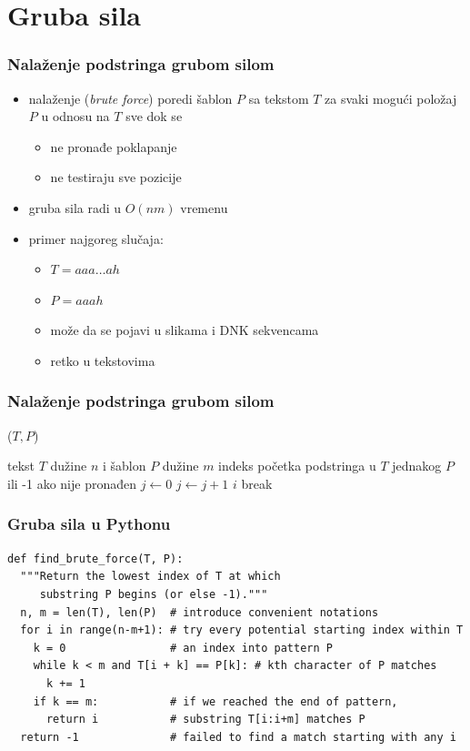 \documentclass[compress]{beamer}
\begin{document}
\section[GS]{Gruba sila}

\begin{frame}[fragile]
  \frametitle{Nalaženje podstringa grubom silom}
  \begin{itemize}
    \item nalaženje  (\textit{brute force}) poredi šablon
    $P$ sa tekstom $T$ za svaki mogući položaj $P$ u odnosu na $T$ sve dok se
    \begin{itemize}
      \item ne pronađe poklapanje
      \item ne testiraju sve pozicije
    \end{itemize}
    \item gruba sila radi u $O(nm)$ vremenu
    \item primer najgoreg slučaja:
    \begin{itemize}
      \item $T = aaa \ldots ah$
      \item $P = aaah$
      \item može da se pojavi u slikama i DNK sekvencama
      \item retko u tekstovima
    \end{itemize}
  \end{itemize}
\end{frame}

\begin{frame}
  \frametitle{Nalaženje podstringa grubom silom}
  ($T, P$)
  \begin{algorithmic}
    \REQUIRE tekst $T$ dužine $n$ i šablon $P$ dužine $m$
    \ENSURE indeks početka podstringa u $T$ jednakog $P$ ili -1 ako nije pronađen
      \STATE $j \leftarrow 0$  
        \STATE $j \leftarrow j+1$
          \RETURN $i$ 
        \ELSE
          \STATE break
        \ENDIF
      \ENDWHILE
    \ENDFOR
     
  \end{algorithmic}    
\end{frame}

\begin{frame}[fragile,shrink=18]
  \frametitle{Gruba sila u Pythonu}
\begin{verbatim}
def find_brute_force(T, P):
  """Return the lowest index of T at which
     substring P begins (or else -1)."""
  n, m = len(T), len(P)  # introduce convenient notations
  for i in range(n-m+1): # try every potential starting index within T
    k = 0                # an index into pattern P
    while k < m and T[i + k] == P[k]: # kth character of P matches
      k += 1
    if k == m:           # if we reached the end of pattern,
      return i           # substring T[i:i+m] matches P
  return -1              # failed to find a match starting with any i
\end{verbatim}
\end{frame}
\end{document}
